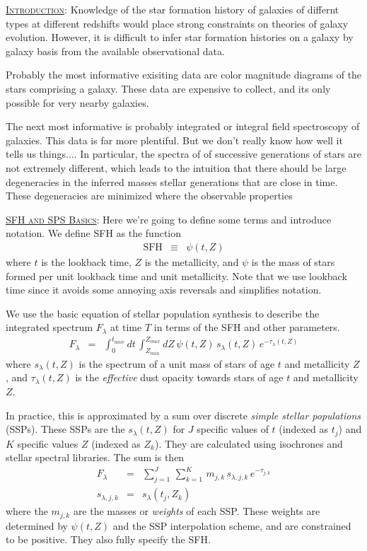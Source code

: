 \documentclass{article}
\begin{document}
\vspace{0.15in}

\underline{\textsc{Introduction}}: 
Knowledge of the star formation history of galaxies of differnt types at different redshifts would place strong constraints on theories of galaxy evolution.
However, it is difficult to infer star formation histories on a galaxy by galaxy basis from the available observational data.

Probably the most informative exisiting data are color magnitude diagrams of the stars comprising a galaxy.
These data are expensive to collect, and its only possible for very nearby galaxies.

The next most informative is probably integrated or integral field spectroscopy of galaxies.
This data is far more plentiful.
But we don't really know how well it tells us things....
In particular, the spectra of of successive generations of stars are not extremely different, 
which leads to the intuition that there should be large degeneracies in the inferred masses stellar generations that are close in time.
These degeneracies are minimized where the observable properties

\vspace{0.15in}

\underline{\textsc{SFH and SPS Basics}}:
Here we're going to define some terms and introduce notation. We define SFH as the function 
\begin{eqnarray}
\mathrm{SFH} & \equiv & \psi(t, Z)
\end{eqnarray}
where $t$ is the lookback time,
$Z$ is the metallicity,
and $\psi$ is the mass of stars formed per unit lookback time and unit metallicity.
Note that we use lookback time since it avoids some annoying axis reversals and simplifies notation.

We use the basic equation of stellar population synthesis to describe the integrated spectrum $F_\lambda$ at time $T$ in terms of the SFH and other parameters.
\begin{eqnarray}
F_\lambda & = & \int_0^{t_{univ}} dt \, \int_{Z_{min}}^{Z_{max}} dZ \, \psi(t, Z) \, s_\lambda(t, Z) \, e^{-\tau_\lambda(t, Z)}
\end{eqnarray}
where $s_\lambda(t, Z)$ is the spectrum of a unit mass of stars of age $t$ and metallicity $Z$, and
$\tau_\lambda(t, Z)$ is the \emph{effective} dust opacity towards stars of age $t$ and metallicity $Z$.

In practice, this is approximated by a sum over discrete \emph{simple stellar populations} (SSPs).  
These SSPs are the $s_\lambda(t, Z)$ for $J$ specific values of $t$ (indexed as $t_j$) and $K$ specific values $Z$ (indexed as $Z_k$).
They are calculated using isochrones and stellar spectral libraries.
The sum is then
\begin{eqnarray}
F_\lambda & = & \sum_{j=1}^J \, \sum_{k=1}^{K} \, m_{j,k} \, s_{\lambda, j,k} \, e^{-\tau_{j,k}} \\
s_{\lambda, j,k} & = & s_\lambda(t_j, Z_k)
\end{eqnarray}
where the $m_{j,k}$ are the masses or \emph{weights} of each SSP.  
These weights are determined by $\psi(t, Z)$ and the SSP interpolation scheme,  and are constrained to be positive.
They also fully specify the SFH.
\end{document}
